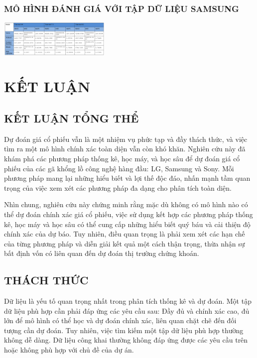\documentclass{article}
\begin{document}
\begin{multicols}{2}
\subsubsection{MÔ HÌNH ĐÁNH GIÁ VỚI TẬP DỮ LIỆU SAMSUNG}
\includegraphics[width=0.4\textwidth]{Image/ket qua/SAMSUNG.png}
\section{KẾT LUẬN }

\subsection{KẾT LUẬN TỔNG THỂ }

Dự đoán giá cổ phiếu vẫn là một nhiệm vụ phức tạp và đầy thách thức, và việc tìm ra một mô hình chính xác toàn diện vẫn còn khó khăn. Nghiên cứu này đã khám phá các phương pháp thống kê, học máy, và học sâu để dự đoán giá cổ phiếu của các gã khổng lồ công nghệ hàng đầu: LG, Samsung và Sony. Mỗi phương pháp mang lại những hiểu biết và lợi thế độc đáo, nhấn mạnh tầm quan trọng của việc xem xét các phương pháp đa dạng cho phân tích toàn diện.

Nhìn chung, nghiên cứu này chứng minh rằng mặc dù không có mô hình nào có thể dự đoán chính xác giá cổ phiếu, việc sử dụng kết hợp các phương pháp thống kê, học máy và học sâu có thể cung cấp những hiểu biết quý báu và cải thiện độ chính xác của dự báo. Tuy nhiên, điều quan trọng là phải xem xét các hạn chế của từng phương pháp và diễn giải kết quả một cách thận trọng, thừa nhận sự bất định vốn có liên quan đến dự đoán thị trường chứng khoán.

\subsection{THÁCH THỨC  }

Dữ liệu là yếu tố quan trọng nhất trong phân tích thống kê và dự đoán. Một tập dữ liệu phù hợp cần phải đáp ứng các yêu cầu sau: Đầy đủ và chính xác cao, đủ lớn để mô hình có thể học và dự đoán chính xác, liên quan chặt chẽ đến đối tượng cần dự đoán. Tuy nhiên, việc tìm kiếm một tập dữ liệu phù hợp thường không dễ dàng. Dữ liệu công khai thường không đáp ứng được các yêu cầu trên hoặc không phù hợp với chủ đề của dự án.


\end{multicols}
\end{document}
